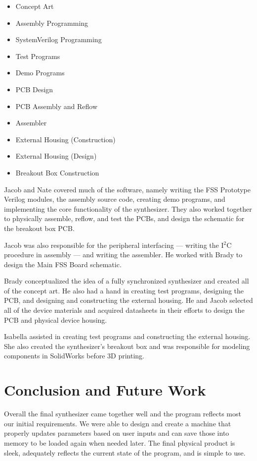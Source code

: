 \documentclass[conference]{IEEEtran}
\begin{document}
\begin{itemize}
\item Concept Art
\item Assembly Programming
\item SystemVerilog Programming
\item Test Programs
\item Demo Programs
\item PCB Design
\item PCB Assembly and Reflow
\item Assembler
\item External Housing (Construction)
\item External Housing (Design)
\item Breakout Box Construction
\end{itemize}

Jacob and Nate covered much of the software, namely writing the FSS Prototype Verilog modules, the  assembly source code, creating demo programs, and implementing the core functionality of the synthesizer. They also worked together to physically assemble, reflow, and test the PCBs, and design the schematic for the breakout box PCB.

Jacob was also responsible for the peripheral interfacing --- writing the I$^2$C procedure in assembly --- and writing the assembler. He worked with Brady to design the Main FSS Board schematic.

Brady conceptualized the idea of a fully synchronized synthesizer and created all of the concept art. He also had a hand in creating test programs, designing the PCB, and designing and constructing the external housing. He and Jacob selected all of the device materials and acquired datasheets in their efforts to design the PCB and physical device housing.

Isabella assisted in creating test programs and constructing the external housing. She also created the synthesizer's breakout box and was responsible for modeling components in SolidWorks before 3D printing.

\section{Conclusion and Future Work}
Overall the final synthesizer came together well and the program reflects most our initial requirements. We were able to design and create a machine that properly updates parameters based on user inputs and can save those into memory to be loaded again when needed later. The final physical product is sleek, adequately reflects the current state of the program, and is simple to use.
\end{document}

